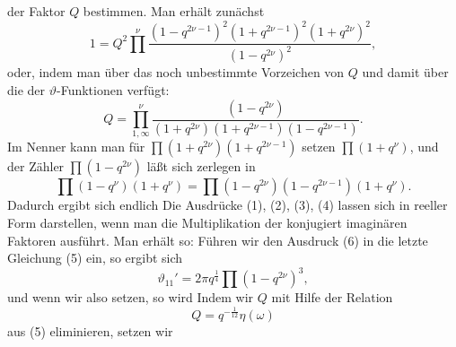 der Faktor $Q$ bestimmen. Man erh\"alt zun\"achst
\[
1 = Q^2\prod^{\nu}\frac{(1-q^{2\nu-1})^2(1+q^{2\nu-1})^2(1+q^{2\nu})^2}{(1-q^{2\nu})^2},
\]
oder, indem man \"uber das noch unbestimmte Vorzeichen von $Q$ und damit \"uber die
 der $\vartheta$-Funktionen verf\"ugt:
\[
Q = \prod_{1,\infty}^{\nu}\frac{(1-q^{2\nu})}{(1+q^{2\nu})(1+q^{2\nu-1})(1-q^{2\nu-1})}.
\]
Im Nenner kann man f\"ur $\prod(1+q^{2\nu})(1+q^{2\nu-1})$ setzen $\prod(1+q^{\nu})$, und
der Z\"ahler $\prod(1-q^{2\nu})$ l\"a\ss{}t sich zerlegen in
\[
\prod(1-q^{\nu})(1+q^{\nu}) = \prod(1-q^{2\nu})(1-q^{2\nu-1})(1+q^{\nu}).
\]
Dadurch ergibt sich endlich
Die Ausdr\"ucke (1), (2), (3), (4) lassen sich in reeller Form darstellen, wenn man die
Multiplikation der konjugiert imagin\"aren Faktoren ausf\"uhrt. Man erh\"alt so:
F\"uhren wir den Ausdruck (6) in die letzte Gleichung (5) ein, so ergibt sich
\[
\vartheta_{11}' = 2\pi q^{\frac{1}{4}}\prod(1 - q^{2\nu})^3,
\]
und wenn wir also
setzen, so wird
Indem wir $Q$ mit Hilfe der Relation
\[
Q = q^{-\frac{1}{12}}\eta(\omega)
\]
aus (5) eliminieren, setzen wir
